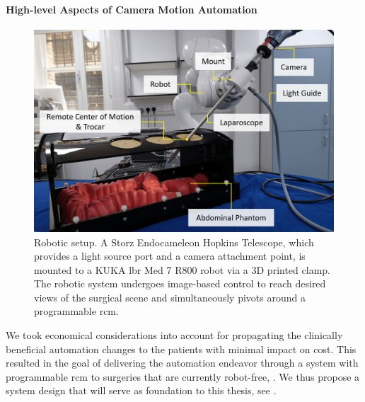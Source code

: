 \paragraph{High-level Aspects of Camera Motion Automation}
\begin{figure}[htb]
	\centering
	\includegraphics[width=\textwidth]{chapter_2/img/labeled_setup_compressed.png}
	\caption{Robotic setup. A Storz Endocameleon Hopkins Telescope, which provides a light source port and a camera attachment point, is mounted to a KUKA \gls{lbr} Med 7 R800 robot via a 3D printed clamp. The robotic system undergoes image-based control to reach desired views of the surgical scene and simultaneously pivots around a programmable \gls{rcm}.}
	\label{in:fig:experimental_setup}
\end{figure}
We took economical considerations into account for propagating the clinically beneficial automation changes to the patients with minimal impact on cost. This resulted in the goal of delivering the automation endeavor through a system with programmable \gls{rcm} to surgeries that are currently robot-free, . We thus propose a system design that will serve as foundation to this thesis, see .

